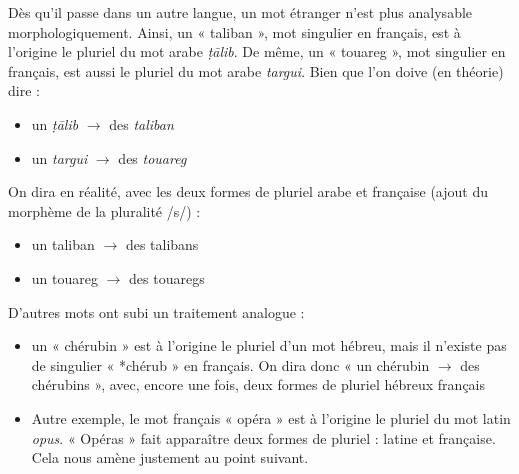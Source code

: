 Dès qu’il passe dans un autre langue, un mot étranger n’est plus analysable morphologiquement. Ainsi, un « taliban », mot singulier en français, est à l’origine le pluriel du mot arabe \textit{ṭālib}. De même, un « touareg », mot singulier en français, est aussi le pluriel du mot arabe \textit{targui}. Bien que l’on doive (en théorie) dire :
\begin{itemize}
\item un \textit{ṭālib} $\rightarrow$ des \textit{taliban}
\item un \textit{targui} $\rightarrow$ des \textit{touareg}
\end{itemize}
On dira en réalité, avec les deux formes de pluriel arabe et française (ajout du morphème de la pluralité /s/) :
\begin{itemize}
\item un taliban $\rightarrow$ des talibans
\item un touareg $\rightarrow$ des touaregs
\end{itemize}
D’autres mots ont subi un traitement analogue :
\begin{itemize}
\item un « chérubin » est à l’origine le pluriel d’un mot hébreu, mais il n’existe pas de singulier « *chérub » en français. On dira donc « un chérubin $\rightarrow$ des chérubins », avec, encore une fois, deux formes de pluriel hébreux français
\item Autre exemple, le mot français « opéra » est à l’origine le pluriel du mot latin \textit{opus}. « Opéras » fait apparaître deux formes de pluriel : latine et française. Cela nous amène justement au point suivant.
\end{itemize}

